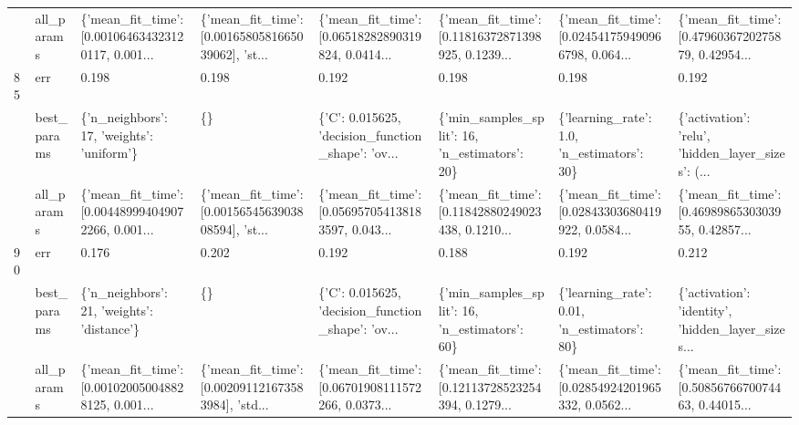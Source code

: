 \begin{tabular}{llllllll}
    & all\_params &  \{'mean\_fit\_time': [0.001064634323120117, 0.001... &  \{'mean\_fit\_time': [0.0016580581665039062], 'st... &  \{'mean\_fit\_time': [0.06518282890319824, 0.0414... &  \{'mean\_fit\_time': [0.11816372871398925, 0.1239... &  \{'mean\_fit\_time': [0.024541759490966798, 0.064... &  \{'mean\_fit\_time': [0.4796036720275879, 0.42954... \\
85  & err &                                              0.198 &                                              0.198 &                                              0.192 &                                              0.198 &                                              0.198 &                                              0.192 \\
    & best\_params &          \{'n\_neighbors': 17, 'weights': 'uniform'\} &                                                 \{\} &  \{'C': 0.015625, 'decision\_function\_shape': 'ov... &      \{'min\_samples\_split': 16, 'n\_estimators': 20\} &         \{'learning\_rate': 1.0, 'n\_estimators': 30\} &  \{'activation': 'relu', 'hidden\_layer\_sizes': (... \\
    & all\_params &  \{'mean\_fit\_time': [0.004489994049072266, 0.001... &  \{'mean\_fit\_time': [0.0015654563903808594], 'st... &  \{'mean\_fit\_time': [0.056957054138183597, 0.043... &  \{'mean\_fit\_time': [0.11842880249023438, 0.1210... &  \{'mean\_fit\_time': [0.02843303680419922, 0.0584... &  \{'mean\_fit\_time': [0.4698986530303955, 0.42857... \\
90  & err &                                              0.176 &                                              0.202 &                                              0.192 &                                              0.188 &                                              0.192 &                                              0.212 \\
    & best\_params &         \{'n\_neighbors': 21, 'weights': 'distance'\} &                                                 \{\} &  \{'C': 0.015625, 'decision\_function\_shape': 'ov... &      \{'min\_samples\_split': 16, 'n\_estimators': 60\} &        \{'learning\_rate': 0.01, 'n\_estimators': 80\} &  \{'activation': 'identity', 'hidden\_layer\_sizes... \\
    & all\_params &  \{'mean\_fit\_time': [0.001020050048828125, 0.001... &  \{'mean\_fit\_time': [0.002091121673583984], 'std... &  \{'mean\_fit\_time': [0.06701908111572266, 0.0373... &  \{'mean\_fit\_time': [0.12113728523254394, 0.1279... &  \{'mean\_fit\_time': [0.02854924201965332, 0.0562... &  \{'mean\_fit\_time': [0.5085676670074463, 0.44015... \\

\end{tabular}
